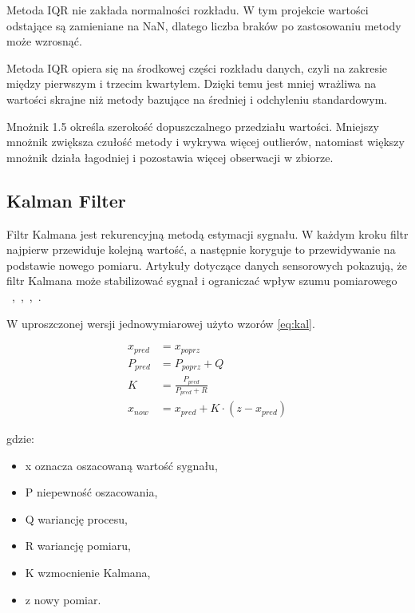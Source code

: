 \documentclass[12pt,twoside]{article}
\begin{document}
Metoda IQR nie zakłada
normalności rozkładu. W tym projekcie wartości odstające są
zamieniane na NaN, dlatego liczba braków po zastosowaniu metody może
wzrosnąć.


Metoda IQR opiera się na
środkowej części rozkładu danych, czyli na zakresie między
pierwszym i trzecim kwartylem. Dzięki temu jest mniej wrażliwa na
wartości skrajne niż metody bazujące na średniej i odchyleniu
standardowym.


Mnożnik 1.5 określa szerokość dopuszczalnego przedziału wartości.
Mniejszy mnożnik zwiększa czułość metody i wykrywa więcej outlierów, natomiast większy mnożnik działa łagodniej i pozostawia więcej obserwacji w zbiorze.

\subsection{Kalman Filter}


Filtr Kalmana jest rekurencyjną metodą estymacji
sygnału. W każdym kroku filtr najpierw przewiduje kolejną wartość,
a następnie koryguje to przewidywanie na podstawie nowego pomiaru.
Artykuły dotyczące danych sensorowych pokazują, że filtr Kalmana
może stabilizować sygnał i ograniczać wpływ szumu pomiarowego ~\cite{bib:ioe1},~\cite{bib:ioe2},~\cite{bib:ioe4},~\cite{bib:ioe5}.


W uproszczonej wersji
jednowymiarowej użyto wzorów \ref{eq:kal}.


\begin{equation}
\label{eq:kal}
\begin{aligned}
x_{\mathit{pred}} &= x_{\mathit{poprz}} \\[1ex]
P_{\mathit{pred}} &= P_{\mathit{poprz}} + Q \\[1ex]
K &= \frac{P_{\mathit{pred}}}{P_{\mathit{pred}} + R} \\[1ex]
x_{\mathit{now}} &= x_{\mathit{pred}} + K \cdot (z - x_{\mathit{pred}})
\end{aligned}
\end{equation}


gdzie:


\begin{itemize}

	\item x oznacza oszacowaną wartość sygnału,



	\item P niepewność oszacowania,



	\item Q wariancję procesu,



	\item R wariancję pomiaru,



	\item K wzmocnienie Kalmana,



	\item z nowy pomiar.



\end{itemize}
\end{document}
